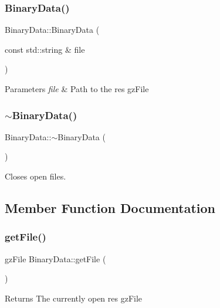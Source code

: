 \subsubsection{\texorpdfstring{Binary\+Data()}{BinaryData()}}
{\footnotesize\ttfamily Binary\+Data\+::\+Binary\+Data (\begin{DoxyParamCaption}\item[{const std\+::string \&}]{file }\end{DoxyParamCaption})}


\begin{DoxyParams}{Parameters}
{\em file} & Path to the res gz\+File \\
\hline
\end{DoxyParams}
\mbox{\label{classBinaryData_a31499383f285646922658e87866a73ea}} 
\subsubsection{\texorpdfstring{$\sim$\+Binary\+Data()}{~BinaryData()}}
{\footnotesize\ttfamily Binary\+Data\+::$\sim$\+Binary\+Data (\begin{DoxyParamCaption}{ }\end{DoxyParamCaption})}



Closes open files. 



\subsection{Member Function Documentation}
\mbox{\label{classBinaryData_a20d3521069ee75c21b83de91ddf5c44b}} 
\subsubsection{\texorpdfstring{get\+File()}{getFile()}}
{\footnotesize\ttfamily gz\+File Binary\+Data\+::get\+File (\begin{DoxyParamCaption}{ }\end{DoxyParamCaption})}

\begin{DoxyReturn}{Returns}
The currently open res gz\+File 
\end{DoxyReturn}
\mbox{\label{classBinaryData_ac2baca71c75e2ea6d12ed89d265dfb6f}} 
